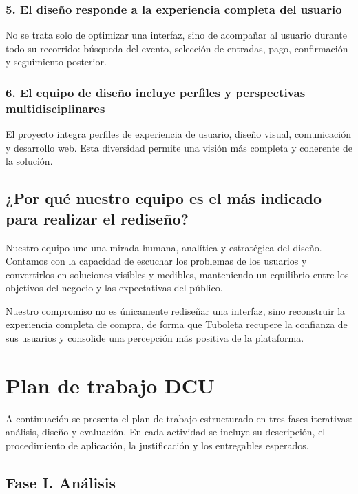 \documentclass[12pt,letterpaper]{article}
\begin{document}
\subsubsection{5. El diseño responde a la experiencia completa del usuario}

No se trata solo de optimizar una interfaz, sino de acompañar al usuario durante todo su recorrido: búsqueda del evento, selección de entradas, pago, confirmación y seguimiento posterior.

\subsubsection{6. El equipo de diseño incluye perfiles y perspectivas multidisciplinares}

El proyecto integra perfiles de experiencia de usuario, diseño visual, comunicación y desarrollo web. Esta diversidad permite una visión más completa y coherente de la solución.

\subsection{¿Por qué nuestro equipo es el más indicado para realizar el rediseño?}

Nuestro equipo une una mirada humana, analítica y estratégica del diseño. Contamos con la capacidad de escuchar los problemas de los usuarios y convertirlos en soluciones visibles y medibles, manteniendo un equilibrio entre los objetivos del negocio y las expectativas del público.

Nuestro compromiso no es únicamente rediseñar una interfaz, sino reconstruir la experiencia completa de compra, de forma que Tuboleta recupere la confianza de sus usuarios y consolide una percepción más positiva de la plataforma.

\section{Plan de trabajo DCU}

A continuación se presenta el plan de trabajo estructurado en tres fases iterativas: análisis, diseño y evaluación. En cada actividad se incluye su descripción, el procedimiento de aplicación, la justificación y los entregables esperados.

\subsection{Fase I. Análisis}
\end{document}
